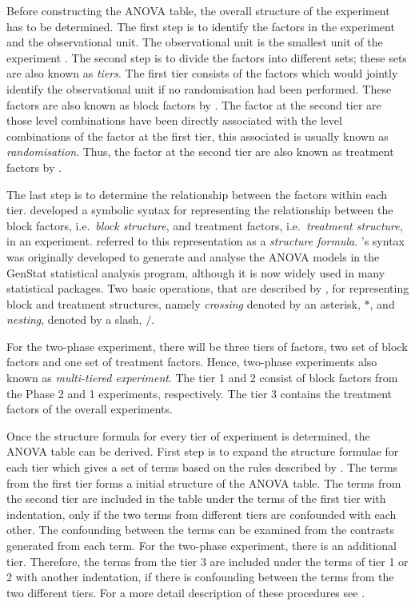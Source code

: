 \documentclass[11pt,a4paper]{article}
\begin{document}
Before constructing the ANOVA table, the overall structure of the experiment has to be determined. The first step is to identify the factors in the experiment and the observational unit. The observational unit is the smallest unit of the experiment \cite{Bailey2008}. The second step is to divide the factors into different sets; these sets are also known as \emph{tiers}. The first tier consists of the factors which would jointly identify the observational unit if no randomisation had been performed. These factors are also known as block factors by \cite{Nelder1965A}. The factor at the second tier are those level combinations have been directly associated with the level combinations of the factor at the first tier, this associated is usually known as \emph{randomisation}. Thus, the factor at the second tier are also known as treatment factors by \cite{Nelder1965B}.
 
The last step is to determine the relationship between the factors within each tier. \cite{Wilkinson1973} developed a symbolic syntax for representing the relationship between the block factors, i.e.\ \emph{block structure}, and treatment factors, i.e.\ \emph{treatment structure}, in an experiment. \cite{Brien1999} referred to this representation as a \emph{structure formula}. \citeauthor{Wilkinson1973}'s syntax was originally developed to generate and analyse the ANOVA models in the GenStat statistical analysis program, although it is now widely used in many statistical packages. Two basic operations, that are described by \cite{Wilkinson1973}, for representing block and treatment structures, namely \emph{crossing} denoted by an asterisk, $*$, and \emph{nesting}, denoted by a slash, $/$. 

For the two-phase experiment, there will be three tiers of factors, two set of block factors and one set of treatment factors. Hence, two-phase experiments also known as \emph{multi-tiered experiment}. The tier 1 and 2 consist of block factors from the Phase 2 and 1 experiments, respectively. The tier 3 contains the treatment factors of the overall experiments.  

Once the structure formula for every tier of experiment is determined, the ANOVA table can be derived. First step is to expand the structure formulae for each tier which gives a set of terms based on the rules described by \cite{Wilkinson1973}. The terms from the first tier forms a initial structure of the ANOVA table. The terms from the second tier are included in the table under the terms of the first tier with indentation, only if the two terms from different tiers are confounded with each other. The confounding between the terms can be examined from the contrasts generated from each term. For the two-phase experiment, there is an additional tier. Therefore, the terms from the tier 3 are included under the terms of tier 1 or 2 with another indentation, if there is confounding between the terms from the two different tiers. For a more detail description of these procedures see \cite{Brien1983}.
\end{document}
